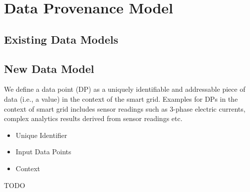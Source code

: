 \section{Data Provenance Model}


\subsection{Existing Data Models}

\subsection{New Data Model}

We define a data point (DP) as a uniquely identifiable and addressable piece of data (i.e., a value) in the context of the smart grid. Examples for DPs in the context of smart grid includes sensor readings such as 3-phase electric currents, complex analytics results derived from sensor readings etc.
\begin{itemize}
	\item Unique Identifier
	\item Input Data Points
	\item Context
\end{itemize}
TODO
